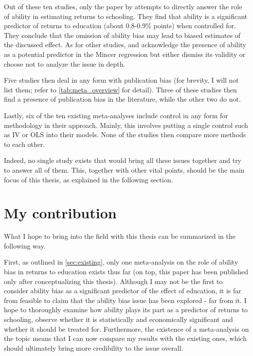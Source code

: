 Out of these ten studies, only the paper by \cite{wincenciak2022meta} attempts to directly answer the role of ability in estimating returns to schooling. They find that ability is a significant predictor of returns to education (about 0.8-0.9\% points) when controlled for. They conclude that the omission of ability bias may lead to biased estimates of the discussed effect. As for other studies, \cite{fleisher2005meta} and \cite{patrinos2020meta} acknowledge the presence of ability as a potential predictor in the Mincer regression but either dismiss its validity or choose not to analyze the issue in depth.

Five studies then deal in any form with publication bias (for brevity, I will not list them; refer to \autoref{tab:meta_overview} for detail). Three of these studies then find a presence of publication bias in the literature, while the other two do not.

Lastly, six of the ten existing meta-analyses include control in any form for methodology in their approach. Mainly, this involves putting a single control such as \ac{IV} or \ac{OLS} into their models. None of the studies then compare more methods to each other.

Indeed, no single study exists that would bring all these issues together and try to answer all of them. This, together with other vital points, should be the main focus of this thesis, as explained in the following section.

\section{My contribution}
\label{sec:contribution}

What I hope to bring into the field with this thesis can be summarized in the following way.

First, as outlined in \autoref{sec:existing}, only one meta-analysis on the role of ability bias in returns to education exists thus far (on top, this paper has been published only after conceptualizing this thesis). Although I may not be the first to consider ability bias as a significant predictor of the effect of education, it is far from feasible to claim that the ability bias issue has been explored - far from it. I hope to thoroughly examine how ability plays its part as a predictor of returns to schooling, observe whether it is statistically and economically significant and whether it should be treated for. Furthermore, the existence of a meta-analysis on the topic means that I can now compare my results with the existing ones, which should ultimately bring more credibility to the issue overall.

